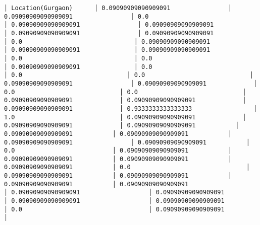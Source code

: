 \documentclass[11pt]{article}
\begin{document}
\begin{Verbatim}[commandchars=\\\{\}]
│ Location(Gurgaon)      │ 0.09090909090909091                │ 0.09090909090909091                │ 0.0                                │ 0.09090909090909091                │ 0.09090909090909091                │ 0.09090909090909091                │ 0.09090909090909091                │ 0.0                               │ 0.09090909090909091               │ 0.09090909090909091               │ 0.09090909090909091                │ 0.0                               │ 0.0                               │ 0.09090909090909091               │ 0.0                             │ 0.0                             │ 0.0                             │ 0.09090909090909091                │ 0.09090909090909091             │ 0.0                             │ 0.0                             │ 0.09090909090909091             │ 0.09090909090909091             │ 0.09090909090909091             │ 0.9333333333333333                 │ 1.0                             │ 0.09090909090909091             │ 0.09090909090909091             │ 0.09090909090909091           │ 0.09090909090909091           │ 0.09090909090909091           │ 0.09090909090909091                │ 0.09090909090909091           │ 0.0                           │ 0.09090909090909091           │ 0.09090909090909091           │ 0.09090909090909091           │ 0.09090909090909091           │ 0.0                                │ 0.09090909090909091           │ 0.09090909090909091           │ 0.09090909090909091           │ 0.09090909090909091                   │ 0.09090909090909091                   │ 0.09090909090909091                   │ 0.09090909090909091                   │ 0.09090909090909091                   │ 0.0                                   │ 0.09090909090909091                   │

\end{Verbatim}
\end{document}
